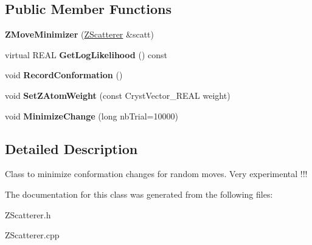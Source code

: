 \subsection*{Public Member Functions}
\begin{DoxyCompactItemize}
\item 
\mbox{\label{class_obj_cryst_1_1_z_move_minimizer_a4ad0464228125bcf96ea69742c41e618}} 
{\bfseries Z\+Move\+Minimizer} (\mbox{\hyperlink{class_obj_cryst_1_1_z_scatterer}{Z\+Scatterer}} \&scatt)
\item 
\mbox{\label{class_obj_cryst_1_1_z_move_minimizer_a24089ba9b177e57c4f3cc55559139d85}} 
virtual R\+E\+AL {\bfseries Get\+Log\+Likelihood} () const
\item 
\mbox{\label{class_obj_cryst_1_1_z_move_minimizer_aa740a4b34e94f988290b4b752a0700ac}} 
void {\bfseries Record\+Conformation} ()
\item 
\mbox{\label{class_obj_cryst_1_1_z_move_minimizer_a2e089c0f16e151b8ef1de4f3252e50fd}} 
void {\bfseries Set\+Z\+Atom\+Weight} (const Cryst\+Vector\+\_\+\+R\+E\+AL weight)
\item 
\mbox{\label{class_obj_cryst_1_1_z_move_minimizer_a8ecf95b446cc5c14768149eb76a8e580}} 
void {\bfseries Minimize\+Change} (long nb\+Trial=10000)
\end{DoxyCompactItemize}


\subsection{Detailed Description}
Class to minimize conformation changes for random moves. Very experimental !!! 

The documentation for this class was generated from the following files\+:\begin{DoxyCompactItemize}
\item 
Z\+Scatterer.\+h\item 
Z\+Scatterer.\+cpp\end{DoxyCompactItemize}

